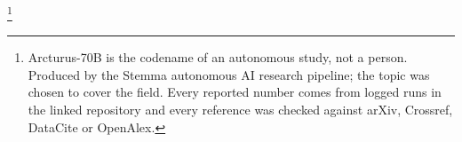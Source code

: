 \thanks{Arcturus-70B is the codename of an autonomous study, not a person. Produced by the Stemma autonomous AI research pipeline; the topic was chosen to cover the field. Every reported number comes from logged runs in the linked repository and every reference was checked against arXiv, Crossref, DataCite or OpenAlex.}
